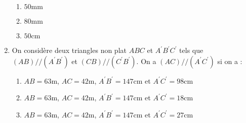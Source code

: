 \documentclass[oneside,twoside]{book}
\begin{document}
\begin{enumerate}
\begin{enumerate}


\item\MauvaiseReponse $50\mathrm{mm}$

\item\BonneReponse $80\mathrm{mm}$

\item\MauvaiseReponse $50\mathrm{cm}$

\end{enumerate}






\item On considère deux triangles non plat $ABC$ et $A^\prime B^\prime C^\prime$ tels que $\left(AB\right)//\left(A^{\prime}B^{\prime}\right)$ et $\left(CB\right)//\left(C^{\prime}B^{\prime}\right)$. On a $\left(AC\right)//\left(A^{\prime}C^{\prime}\right)$ si on a :

\begin{enumerate}

\item\BonneReponse $AB=63\mathrm{m}$, $AC=42\mathrm{m}$, $A^{\prime}B^{\prime}=147\mathrm{cm}$ et $A^{\prime}C^{\prime}=98\mathrm{cm}$

\item\MauvaiseReponse $AB=63\mathrm{m}$, $AC=42\mathrm{m}$, $A^{\prime}B^{\prime}=147\mathrm{cm}$ et $A^{\prime}C^{\prime}=18\mathrm{cm}$

\item\MauvaiseReponse $AB=63\mathrm{m}$, $AC=42\mathrm{m}$, $A^{\prime}B^{\prime}=147\mathrm{cm}$ et $A^{\prime}C^{\prime}=27\mathrm{cm}$

\end{enumerate}


\end{enumerate}
\end{document}
